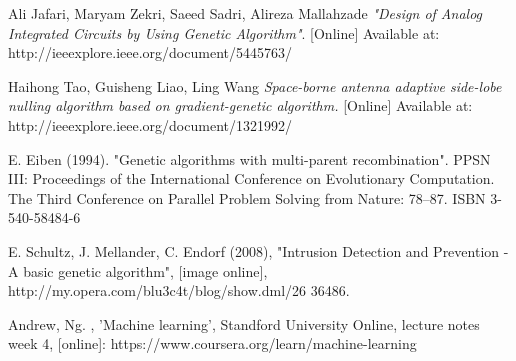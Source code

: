 \documentclass[conference]{IEEEtran}
\begin{document}
\begin{thebibliography}{5}

Ali Jafari, Maryam Zekri, Saeed Sadri, Alireza Mallahzade \emph{"Design of Analog Integrated Circuits by Using Genetic Algorithm"}. [Online] Available at:
http://ieeexplore.ieee.org/document/5445763/

Haihong Tao, Guisheng Liao, Ling Wang \emph{Space-borne antenna adaptive side-lobe nulling algorithm based on gradient-genetic algorithm.} [Online] Available at: http://ieeexplore.ieee.org/document/1321992/

E. Eiben (1994). "Genetic algorithms with multi-parent recombination". PPSN III:
Proceedings of the International Conference on
Evolutionary Computation. The Third
Conference on Parallel Problem Solving from
Nature: 78–87. ISBN 3-540-58484-6

E. Schultz, J. Mellander, C. Endorf (2008), "Intrusion Detection and Prevention - A basic genetic algorithm", [image online], http://my.opera.com/blu3c4t/blog/show.dml/26
36486. 

Andrew, Ng. , 'Machine learning', Standford University Online, lecture notes week 4, [online]: https://www.coursera.org/learn/machine-learning
\end{thebibliography}
\end{document}
